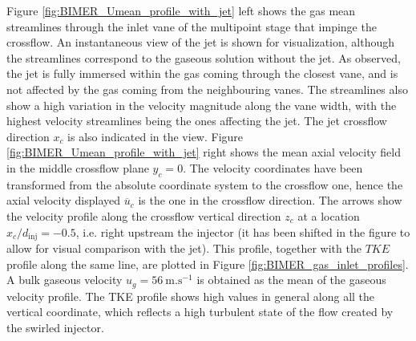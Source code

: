 Figure \ref{fig:BIMER_Umean_profile_with_jet} left shows the gas mean streamlines through the inlet vane of the multipoint stage that impinge the crossflow. An instantaneous view of the jet is shown for visualization, although the streamlines correspond to the gaseous solution without the jet. As observed, the jet is fully immersed within the gas coming through the closest vane, and is not affected by the gas coming from the neighbouring vanes. The streamlines also show a high variation in the velocity magnitude along the vane width, with the highest velocity streamlines being the ones affecting the jet. The jet crossflow direction $x_c$ is also indicated in the view. Figure \ref{fig:BIMER_Umean_profile_with_jet} right shows the mean axial velocity field in the middle crossflow plane $y_c = 0$. The velocity coordinates have been transformed from the absolute coordinate system to the crossflow one, hence the axial velocity displayed $\overline{u}_c$ is the one in the crossflow direction. The arrows show the velocity profile along the crossflow vertical direction $z_c$ at a location $x_c/d_\mathrm{inj} = -0.5$, i.e. right upstream the injector (it has been shifted in the figure to allow for visual comparison with the jet). This profile, together with the $TKE$ profile along the same line, are plotted in Figure \ref{fig:BIMER_gas_inlet_profiles}. A bulk gaseous velocity $u_g = 56 ~\mathrm{m}.\mathrm{s}^{-1}$ is obtained as the mean of the gaseous velocity profile. The TKE profile shows high values in general along all the vertical coordinate, which reflects a high turbulent state of the flow created by the swirled injector. %


